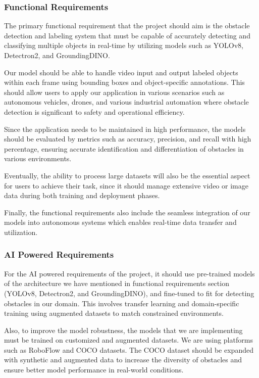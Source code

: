 \documentclass[stu,12pt,floatsintext]{apa7}
\begin{document}
\subsubsection{Functional Requirements}

The primary functional requirement that the project should aim is the obstacle detection and labeling system that must be capable of accurately detecting and classifying multiple objects in real-time by utilizing models such as YOLOv8, Detectron2, and GroundingDINO.

Our model should be able to handle video input and output labeled objects within each frame using bounding boxes and object-specific annotations. This should allow users to apply our application in various scenarios such as autonomous vehicles, drones, and various industrial automation where obstacle detection is significant to safety and operational efficiency.

Since the application needs to be maintained in high performance, the models should be evaluated by metrics such as accuracy, precision, and recall with high percentage, ensuring accurate identification and differentiation of obstacles in various environments.

Eventually, the ability to process large datasets will also be the essential aspect for users to achieve their task, since it should manage extensive video or image data during both training and deployment phases.

Finally, the functional requirements also include the seamless integration of our models into autonomous systems which enables real-time data transfer and utilization.

\subsubsection{AI Powered Requirements}

For the AI powered requirements of the project, it should use pre-trained models of the architecture we have mentioned in functional requirements section (YOLOv8, Detectron2, and GroundingDINO), and fine-tuned to fit for detecting obstacles in our domain. This involves transfer learning and domain-specific training using augmented datasets to match constrained environments.

Also, to improve the model robustness, the models that we are implementing must be trained on customized and augmented datasets. We are using platforms such as RoboFlow and COCO datasets. The COCO dataset should be expanded with synthetic and augmented data to increase the diversity of obstacles and ensure better model performance in real-world conditions.
\end{document}
